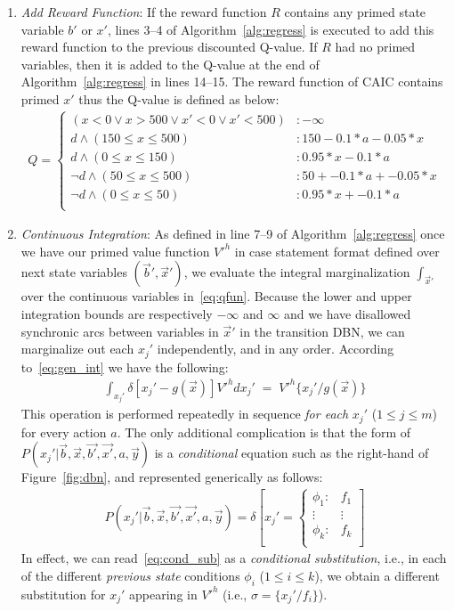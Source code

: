 \documentclass[twoside,11pt]{article}
\begin{document}
\begin{enumerate}
\item {\it Add Reward Function}: If the reward function $R$ contains any primed state variable $b'$ or $x'$, lines 3--4 of Algorithm~\ref{alg:regress} is executed to add this reward function to the previous discounted Q-value. If $R$ had no primed variables, then it is added to the Q-value at the end of Algorithm~\ref{alg:regress} in lines 14--15. The reward function of \textsc{CAIC} contains primed $x'$ thus the Q-value is defined as below: 
\vspace{-1mm}
\begin{align}
Q = \begin{cases}
(x < 0 \vee x>500 \vee x'<0 \vee x'<500) &: -\infty \\
d \land (150 \leq x \leq 500) &:  150 - 0.1 * a - 0.05 * x \\
d \land (0 \leq x \leq 150) &:  0.95 * x - 0.1 * a \\
\neg d \land (50 \leq x \leq 500) &: 50 + -0.1 * a+ -0.05 * x \\
\neg d \land (0 \leq x \leq 50) &:  0.95 * x + -0.1 * a\\
\end{cases} \nonumber
\end{align}
\item {\it Continuous Integration}: As defined in line 7--9 of Algorithm~\ref{alg:regress} once we have our primed value
function $V'^{h}$ in case statement format defined over next state
variables $(\vec{b}',\vec{x}')$, we evaluate the integral
marginalization $\int_{\vec{x}'}$ over the continuous variables
in~\eqref{eq:qfun}.  Because the lower and upper integration bounds
are respectively $-\infty$ and $\infty$
and we have disallowed synchronic arcs between variables in $\vec{x}'$ 
in the transition DBN, we can marginalize out each
$x_j'$ independently, and in any order. According to~\eqref{eq:gen_int} we have the following: 
\begin{align*}
\int_{x_j'} \delta[x_j' - g(\vec{x})] V'^{h} dx_j' \; = \; V'^{h} \{x_j' / g(\vec{x}) \}  
\end{align*}
This
operation is performed repeatedly in sequence \emph{for each}
$x_j'$ ($1 \leq j \leq m$) for every action $a$.  The only
additional complication is that the form of 
$P(x_j'|\vec{b},\vec{x},\vec{b'},\vec{x'},a,\vec{y})$ is a \emph{conditional} 
equation such as the right-hand of Figure~\ref{fig:dbn}, and represented generically
as follows:
\begin{align}
   P(x_j'|\vec{b},\vec{x},\vec{b'},\vec{x'},a,\vec{y}) = \delta\left[ x_j' = \begin{cases}
    \phi_1: & f_1 \\ 
   \vdots&\vdots\\ 
    \phi_k: & f_k \\ 
  \end{cases} \right] \label{eq:cond_sub}
\end{align}
In effect, we can read~\eqref{eq:cond_sub} as a \emph{conditional
substitution}, i.e., in each of the different \emph{previous state}
conditions $\phi_i$ ($1 \leq i \leq k$), we obtain a different
substitution for $x_j'$ appearing in $V'^{h}$ (i.e., $\sigma = \{ x_j' / f_i
\}$). 


\end{enumerate}
\end{document}
